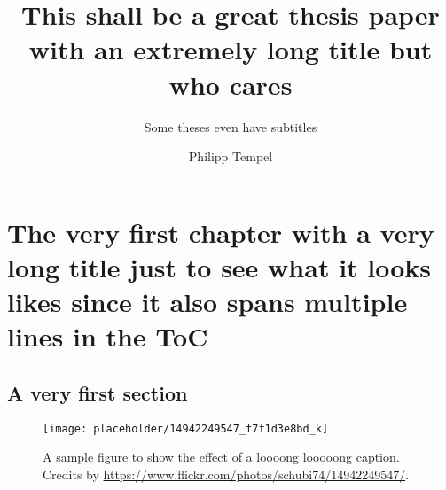 \documentclass[%
    thesis=ma, %
    language=american, %
    paper=a4,%
    listings,
]{isw}
\title{This shall be a great thesis paper with an extremely long title but who cares}
\subtitle{Some theses even have subtitles}
\author{Philipp Tempel}
\begin{document}
    \maketitle
    
    \begin{otherlanguage}{ngerman}\maketitle \end{otherlanguage}
    
    \tableofcontents
    
    \listoffigures
    
    \listoftables
    
    \chapter[The short title of the chapter showing up in the TOC and the page headers]{The very first chapter with a very long title just to see what it looks likes since it also spans multiple lines in the ToC}
    
    \section{A very first section}
    
    \begin{figure}
        \centering
        \texttt{[image: placeholder/14942249547\_f7f1d3e8bd\_k]}
        \caption{A sample figure to show the effect of a loooong looooong caption. Credits by \url{https://www.flickr.com/photos/schubi74/14942249547/}.}
        \label{fig:sample-figure}
    \end{figure}
    
    
\end{document}
